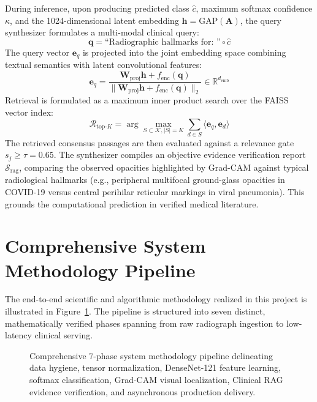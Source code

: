 \documentclass[12pt,a4paper]{report}
\begin{document}
During inference, upon producing predicted class $\hat{c}$, maximum softmax confidence $\kappa$, and the 1024-dimensional latent embedding $\mathbf{h} = \mathrm{GAP}(\mathbf{A})$, the query synthesizer formulates a multi-modal clinical query:
\begin{equation}
    \mathbf{q} = \text{``Radiographic hallmarks for: ''} \circ \hat{c}
\end{equation}
The query vector $\mathbf{e}_q$ is projected into the joint embedding space combining textual semantics with latent convolutional features:
\begin{equation}
    \mathbf{e}_q = \frac{\mathbf{W}_{\text{proj}} \mathbf{h} + f_{\text{enc}}(\mathbf{q})}{\|\mathbf{W}_{\text{proj}} \mathbf{h} + f_{\text{enc}}(\mathbf{q})\|_2} \in \mathbb{R}^{d_{\text{emb}}}
\end{equation}
Retrieval is formulated as a maximum inner product search over the FAISS vector index:
\begin{equation}
    \mathcal{R}_{\text{top-}K} = \arg\max_{S \subset \mathcal{K}, |S|=K} \sum_{d \in S} \langle \mathbf{e}_q, \mathbf{e}_d \rangle
\end{equation}
The retrieved consensus passages are then evaluated against a relevance gate $s_j \ge \tau = 0.65$. The synthesizer compiles an objective evidence verification report $\mathcal{S}_{\text{rag}}$, comparing the observed opacities highlighted by Grad-CAM against typical radiological hallmarks (e.g., peripheral multifocal ground-glass opacities in COVID-19 versus central perihilar reticular markings in viral pneumonia). This grounds the computational prediction in verified medical literature.

\section{Comprehensive System Methodology Pipeline}
The end-to-end scientific and algorithmic methodology realized in this project is illustrated in Figure~\ref{fig:detailed_methodology}. The pipeline is structured into seven distinct, mathematically verified phases spanning from raw radiograph ingestion to low-latency clinical serving.

\begin{figure}[H]
    \centering
    \caption{Comprehensive 7-phase system methodology pipeline delineating data hygiene, tensor normalization, DenseNet-121 feature learning, softmax classification, Grad-CAM visual localization, Clinical RAG evidence verification, and asynchronous production delivery.}
    \label{fig:detailed_methodology}
\end{figure}
\end{document}
